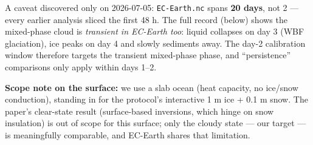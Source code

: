 \documentclass[11pt]{article}
\begin{document}
A caveat discovered only on 2026-07-05: \texttt{EC-Earth.nc} spans
\textbf{20 days}, not 2 --- every earlier analysis sliced the first 48
h. The full record (below) shows the mixed-phase cloud is
\emph{transient in EC-Earth too}: liquid collapses on day 3 (WBF
glaciation), ice peaks on day 4 and slowly sediments away. The day-2
calibration window therefore targets the transient mixed-phase phase,
and ``persistence'' comparisons only apply within days 1--2.

\textbf{Scope note on the surface:} we use a slab ocean (heat capacity,
no ice/snow conduction), standing in for the protocol's interactive 1 m
ice + 0.1 m snow. The paper's clear-state result (surface-based
inversions, which hinge on snow insulation) is out of scope for this
surface; only the cloudy state --- our target --- is meaningfully
comparable, and EC-Earth shares that limitation.
\end{document}
